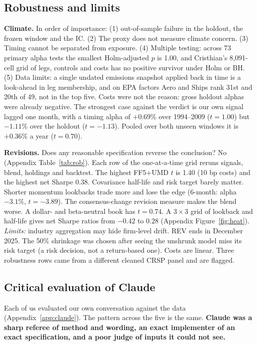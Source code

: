 \documentclass[11pt]{article}
\begin{document}
\subsection{Robustness and limits}
\label{sec:robust}

\textbf{Climate.} In order of importance: (1) out-of-sample failure in the holdout, the frozen window and the IC. (2) The proxy does not measure climate concern. (3) Timing cannot be separated from exposure. (4) Multiple testing: across 73 primary alpha tests the smallest Holm-adjusted $p$ is 1.00, and Cristhian's 8,091-cell grid of legs, controls and costs has no positive survivor under Holm or BH. (5) Data limits: a single undated emissions snapshot applied back in time is a look-ahead in leg membership, and on EPA factors Aero and Ships rank 31st and 20th of 49, not in the top five. Costs were not the reason: gross holdout alphas were already negative. The strongest case against the verdict is our own signal lagged one month, with a timing alpha of $+0.69\%$ over 1994--2009 ($t=1.00$) but $-1.11\%$ over the holdout ($t=-1.13$). Pooled over both unseen windows it is $+0.36\%$ a year ($t=0.70$).

\textbf{Revisions.} Does any reasonable specification reverse the conclusion? No (Appendix Table~\ref{tab:rob}). Each row of the one-at-a-time grid reruns signals, blend, holdings and backtest. The highest FF5+UMD $t$ is 1.40 (10 bp costs) and the highest net Sharpe 0.38. Covariance half-life and risk target barely matter. Shorter momentum lookbacks trade more and lose the edge (6-month: alpha $-3.1\%$, $t=-3.89$). The consensus-change revision measure makes the blend worse. A dollar- and beta-neutral book has $t=0.74$. A $3\times3$ grid of lookback and half-life gives net Sharpe ratios from $-0.42$ to $0.28$ (Appendix Figure~\ref{fig:heat}). \emph{Limits:} industry aggregation may hide firm-level drift. REV ends in December 2025. The 50\% shrinkage was chosen after seeing the unshrunk model miss its risk target (a risk decision, not a return-based one). Costs are linear. Three robustness rows came from a different cleaned CRSP panel and are flagged.

\subsection{Critical evaluation of Claude}
\label{sec:claude}

Each of us evaluated our own conversation against the data (Appendix~\ref{app:claude}). The pattern across the five is the same. \textbf{Claude was a sharp referee of method and wording, an exact implementer of an exact specification, and a poor judge of inputs it could not see.}
\end{document}
